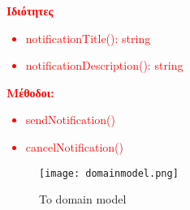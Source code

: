 \documentclass{article}
\begin{document}
\textcolor{red}{
\textbf{\textgreek{Ιδιότητες}}
\begin{itemize}
    \item notificationTitle(): string
    \item notificationDescription(): string
\end{itemize}
\textbf{\textgreek{Μέθοδοι:}}
\begin{itemize}
    \item sendNotification()
    \item cancelNotification()
\end{itemize}
}
\newpage

\begin{figure}
    \centering
    \texttt{[image: domainmodel.png]}
    \caption{To domain model}
    \label{fig:enter-label}
\end{figure}
\end{document}

